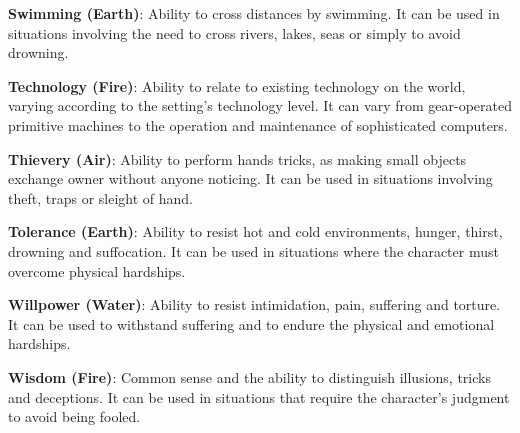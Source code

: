 \begin{multicols}{2}
\textbf{Swimming (Earth)}: Ability to cross
distances by swimming. It can be used in
situations involving the need to cross rivers, lakes,
seas or simply to avoid drowning.

\textbf{Technology (Fire)}: Ability to relate to
existing technology on the world, varying
according to the setting’s technology level. It can
vary from gear-operated primitive machines to the
operation and maintenance of sophisticated
computers.

\textbf{Thievery (Air)}: Ability to perform hands
tricks, as making small objects exchange owner
without anyone noticing. It can be used in
situations involving theft, traps or sleight of hand.

\textbf{Tolerance (Earth)}: Ability to resist hot
and cold environments, hunger, thirst, drowning
and suffocation. It can be used in situations where
the character must overcome physical hardships.

\textbf{Willpower (Water)}: Ability to resist
intimidation, pain, suffering and torture. It can be
used to withstand suffering and to endure the
physical and emotional hardships.

\textbf{Wisdom (Fire)}: Common sense and the
ability to distinguish illusions, tricks and
deceptions. It can be used in situations that
require the character’s judgment to avoid being
fooled.
\end{multicols}